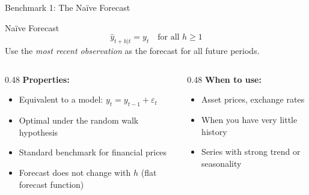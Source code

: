 \documentclass[aspectratio=169, 11pt]{beamer}
\begin{document}
\begin{frame}{Benchmark 1: The Na\"{i}ve Forecast}
  \begin{definitionbox}{Na\"{i}ve Forecast}
    \[
      \hat{y}_{t+h|t} = y_t \quad \text{for all } h \geq 1
    \]
    Use the \emph{most recent observation} as the forecast for all future periods.
  \end{definitionbox}
  \vspace{0.1cm}
  \begin{columns}[T]
    \begin{column}{0.48\textwidth}
      \textbf{Properties:}
      \begin{itemize}
        \item Equivalent to a  model: $y_t = y_{t-1} + \varepsilon_t$
        \item Optimal under the random walk hypothesis
        \item Standard benchmark for financial prices
        \item Forecast does not change with $h$ (flat forecast function)
      \end{itemize}
    \end{column}
    \begin{column}{0.48\textwidth}
      \textbf{When to use:}
      \begin{itemize}
        \item[\pos{$\checkmark$}] Asset prices, exchange rates
        \item[\pos{$\checkmark$}] When you have very little history
        \item[\negc{$\times$}] Series with strong trend or seasonality
      \end{itemize}
      \vspace{0.05cm}
    \end{column}
  \end{columns}
\end{frame}
\end{document}
